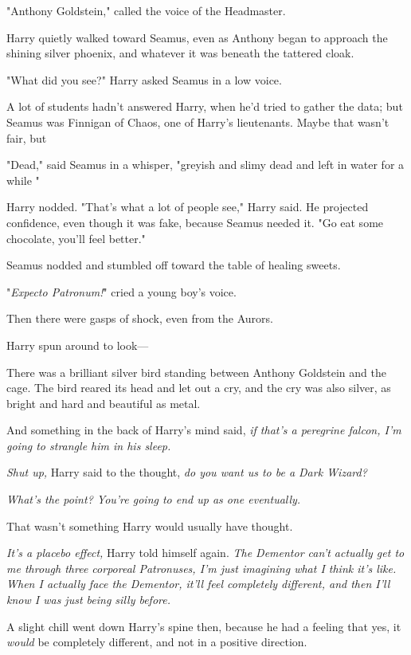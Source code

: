 "Anthony Goldstein," called the voice of the Headmaster.

Harry quietly walked toward Seamus, even as Anthony began to approach the
shining silver phoenix, and{\el} whatever it was beneath the tattered cloak.

"What did you see?" Harry asked Seamus in a low voice.

A lot of students hadn't answered Harry, when he'd tried to gather the data;
but Seamus was Finnigan of Chaos, one of Harry's lieutenants. Maybe that wasn't
fair, but{\el}

"Dead," said Seamus in a whisper, "greyish and slimy{\el} dead and left in
water for a while{\el} "

Harry nodded. "That's what a lot of people see," Harry said. He projected
confidence, even though it was fake, because Seamus needed it. "Go eat some
chocolate, you'll feel better."

Seamus nodded and stumbled off toward the table of healing sweets.

"\emph{Expecto Patronum!}" cried a young boy's voice.

Then there were gasps of shock, even from the Aurors.

Harry spun around to look---

There was a brilliant silver bird standing between Anthony Goldstein and the
cage. The bird reared its head and let out a cry, and the cry was also silver,
as bright and hard and beautiful as metal.

And something in the back of Harry's mind said, \emph{if that's a peregrine
falcon, I'm going to strangle him in his sleep.}

\emph{Shut up,} Harry said to the thought, \emph{do you want us to be a Dark
Wizard?}

\emph{What's the point? You're going to end up as one eventually.}

That{\el} wasn't something Harry would usually have thought.

\emph{It's a placebo effect,} Harry told himself again. \emph{The Dementor
can't actually get to me through three corporeal Patronuses, I'm just imagining
what I think it's like. When I actually face the Dementor, it'll feel
completely different, and then I'll know I was just being silly before.}

A slight chill went down Harry's spine then, because he had a feeling that yes,
it \emph{would} be completely different, and not in a positive direction.

